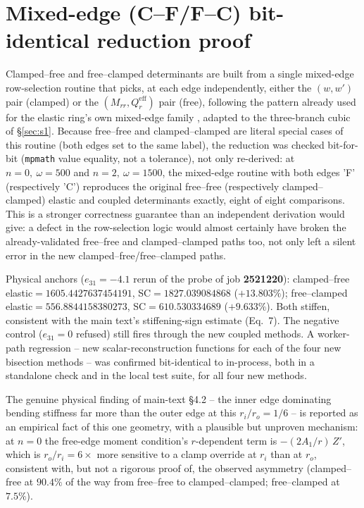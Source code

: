 \documentclass[11pt]{article}
\begin{document}
\section{Mixed-edge (C--F/F--C) bit-identical reduction proof}
\label{sec:s6}
Clamped--free and free--clamped determinants are built from a single
mixed-edge row-selection routine that picks, at each edge
independently, either the $(w,w')$ pair (clamped) or the $(M_{rr},Q_r^{\mathrm{eff}})$
pair (free), following the pattern already used for the elastic ring's
own mixed-edge family \cite{mccune2026ring}, adapted to the three-branch
cubic of \S\ref{sec:s1}. Because free--free and clamped--clamped are
literal special cases of this routine (both edges set to the same
label), the reduction was checked bit-for-bit (\texttt{mpmath} value
equality, not a tolerance), not only re-derived: at $n=0,\ \omega=500$
and $n=2,\ \omega=1500$, the mixed-edge routine with both edges 'F'
(respectively 'C') reproduces the original free--free (respectively
clamped--clamped) elastic and coupled determinants exactly, eight of
eight comparisons. This is a stronger correctness guarantee than an
independent derivation would give: a defect in the row-selection logic
would almost certainly have broken the already-validated free--free and
clamped--clamped paths too, not only left a silent error in the new
clamped--free/free--clamped paths.

Physical anchors ($e_{31}=-4.1$ rerun of the probe of job
\textbf{2521220}): clamped--free
elastic$=1605.4427637454191$, SC$=1827.039084868$
($+13.803\%$); free--clamped elastic$=556.8844158380273$,
SC$=610.530334689$ ($+9.633\%$). Both stiffen, consistent with
the main text's stiffening-sign estimate (Eq.~7). The negative control ($e_{31}=0$
refused) still fires through the new coupled methods. A worker-path
regression -- new scalar-reconstruction functions for each of the four
new bisection methods -- was confirmed bit-identical to in-process, both
in a standalone check and in the local test suite, for all four new
methods.

The genuine physical finding of main-text \S4.2 -- the inner edge
dominating bending stiffness far more than the outer edge at this
$r_i/r_o=1/6$ -- is reported as an empirical fact of this one geometry,
with a plausible but unproven mechanism: at $n=0$ the free-edge moment
condition's $r$-dependent term is $-(2A_1/r)\,Z'$, which is
$r_o/r_i=6\times$ more sensitive to a clamp override at $r_i$ than at
$r_o$, consistent with, but not a rigorous proof of, the observed
asymmetry (clamped--free at $90.4\%$ of the way from free--free to
clamped--clamped; free--clamped at $7.5\%$).
\end{document}
